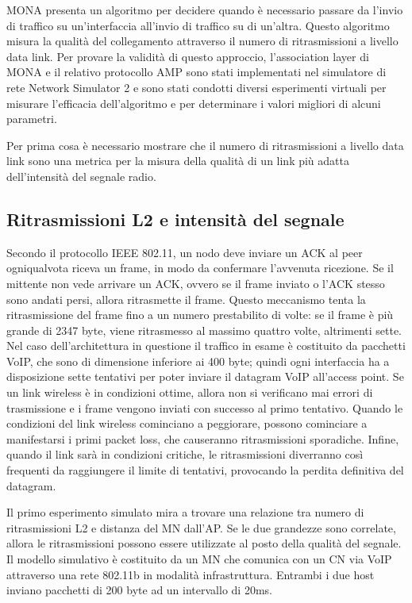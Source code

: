\documentclass[12pt,a4paper,openright,twoside]{book}
\begin{document}
MONA presenta un algoritmo per decidere quando è necessario passare
da l'invio di traffico su un'interfaccia all'invio di traffico su di
un'altra. Questo algoritmo misura la qualità del collegamento
attraverso il numero di ritrasmissioni a livello data link. Per
provare la validità di questo approccio, l'association layer di MONA e
il relativo protocollo AMP sono stati implementati nel simulatore di
rete Network Simulator 2 e sono stati condotti diversi esperimenti
virtuali per misurare l'efficacia dell'algoritmo e per determinare i
valori migliori di alcuni parametri.

Per prima cosa è necessario mostrare che il numero di ritrasmissioni a
livello data link sono una metrica per la misura della qualità di un
link più adatta dell'intensità del segnale radio.

\subsection{Ritrasmissioni L2 e intensità del segnale}

Secondo il protocollo IEEE 802.11, un nodo deve inviare un ACK al peer
ogniqualvota riceva un frame, in modo da confermare l'avvenuta
ricezione. Se il mittente non vede arrivare un ACK, ovvero se il frame
inviato o l'ACK stesso sono andati persi, allora ritrasmette il
frame. Questo meccanismo tenta la ritrasmissione del frame fino a un
numero prestabilito di volte: se il frame è più grande di 2347 byte,
viene ritrasmesso al massimo quattro volte, altrimenti sette. Nel caso
dell'architettura in questione il traffico in esame è costituito da
pacchetti VoIP, che sono di dimensione inferiore ai 400 byte; quindi
ogni interfaccia ha a disposizione sette tentativi per poter inviare
il datagram VoIP all'access point. Se un link wireless è in condizioni
ottime, allora non si verificano mai errori di trasmissione e i frame
vengono inviati con successo al primo tentativo. Quando le condizioni
del link wireless cominciano a peggiorare, possono cominciare a
manifestarsi i primi packet loss, che causeranno ritrasmissioni
sporadiche. Infine, quando il link sarà in condizioni critiche, le
ritrasmissioni diverranno così frequenti da raggiungere il limite di
tentativi, provocando la perdita definitiva del datagram.

Il primo esperimento simulato mira a trovare una relazione tra numero
di ritrasmissioni L2 e distanza del MN dall'AP. Se le due grandezze
sono correlate, allora le ritrasmissioni possono essere utilizzate al
posto della qualità del segnale. Il modello simulativo è costituito da
un MN che comunica con un CN via VoIP attraverso una rete 802.11b in
modalità infrastruttura. Entrambi i due host inviano pacchetti di 200
byte ad un intervallo di 20ms.
\end{document}
